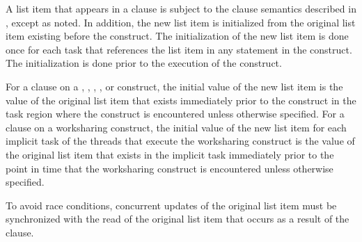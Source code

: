 A list item that appears in a  clause is subject to the  clause
semantics described in
,
except as noted. In addition, the
new list item is initialized from the original list item existing before the construct. The
initialization of the new list item is done once for each task that references the list item
in any statement in the construct. The initialization is done prior to the execution of the
construct.

For a  clause on a , ,
, , or  construct, the initial
value of the new list item is the value of the original list item that
exists immediately prior to the construct in the task region where the
construct is encountered unless otherwise specified. For a
 clause on a worksharing construct, the initial
value of the new list item for each implicit task of the threads that
execute the worksharing construct is the value of the original list
item that exists in the implicit task immediately prior to the point
in time that the worksharing construct is encountered unless otherwise
specified.

To avoid race conditions, concurrent updates of the original list item must be
synchronized with the read of the original list item that occurs as a result of the
 clause.

